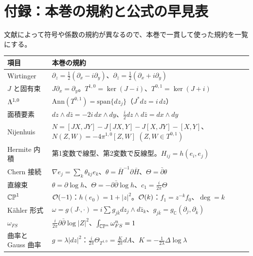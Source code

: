 \section*{付録：本巻の規約と公式の早見表}
文献によって符号や係数の規約が異なるので、本巻で一貫して使った規約を一覧にする。
\begin{center}
\begin{tabular}{p{}p{}}
\toprule
項目 & 本巻の規約\\
\midrule
Wirtinger & $\partial_z=\frac12(\partial_x-i\partial_y)$、$\partial_{\bar z}=\frac12(\partial_x+i\partial_y)$\\
$J$ と固有束 & $J\partial_x=\partial_y$。$T^{1,0}=\ker(J-i)$、$T^{0,1}=\ker(J+i)$\\
$\Lambda^{1,0}$ & $\mathrm{Ann}(T^{0,1})=\mathrm{span}\{dz_j\}$（$J^*dz=i\,dz$）\\
面積要素 & $dz\wedge d\bar z=-2i\,dx\wedge dy$、$\frac i2dz\wedge d\bar z=dx\wedge dy$\\
Nijenhuis & $N=[JX,JY]-J[JX,Y]-J[X,JY]-[X,Y]$、$N(Z,W)=-4\pi^{1,0}[Z,W]$ $(Z,W\in T^{0,1})$\\
Hermite 内積 & 第1変数で線型、第2変数で反線型。$H_{ij}=h(e_i,e_j)$\\
Chern 接続 & $\nabla e_j=\sum_k\theta_{kj}e_k$、$\theta=\bar H^{-1}\partial\bar H$、$\Theta=\bar\partial\theta$\\
直線束 & $\theta=\partial\log h$、$\Theta=-\partial\bar\partial\log h$、$c_1=\frac i{2\pi}\Theta$\\
$\mathbb{CP}^1$ & $\mathcal O(-1)$：$h(e_0)=1+|z|^2$。$\mathcal O(k)$：$f_1=z^{-k}f_0$、$\deg=k$\\
Kähler 形式 & $\omega=g(J\cdot,\cdot)=i\sum g_{j\bar k}dz_j\wedge d\bar z_k$、$g_{j\bar k}=g_{\mathbb C}(\partial_j,\partial_{\bar k})$\\
$\omega_{FS}$ & $\frac i{2\pi}\partial\bar\partial\log|Z|^2$、$\int_{\mathbb{CP}^n}\omega_{FS}^n=1$\\
曲率と Gauss 曲率 & $g=\lambda|dz|^2$：$\frac i{2\pi}\Theta_{T^{1,0}}=\frac K{2\pi}dA$、$K=-\frac1{2\lambda}\Delta\log\lambda$\\
\bottomrule
\end{tabular}
\end{center}

